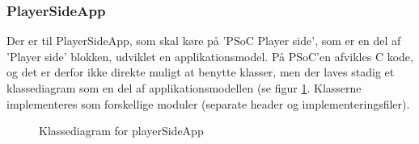 \documentclass[Arkitektur/System_main.tex]{subfiles}
\begin{document}
\subsubsection{PlayerSideApp} \label{sec:playersideapp_application_model}
Der er til PlayerSideApp, som skal køre på 'PSoC Player side', som er en del af 'Player side' blokken, udviklet en applikationsmodel. På PSoC'en afvikles C kode, og det er derfor ikke direkte muligt at benytte klasser, men der laves stadig et klassediagram som en del af applikationsmodellen (se figur \ref{fig:CD_PlayerSide}. Klasserne implementeres som forskellige moduler (separate header og implementeringsfiler).

\begin{figure}[H]
    \centering
    \centering
    \caption{Klassediagram for playerSideApp}
    \label{fig:CD_PlayerSide}
\end{figure}
\end{document}
